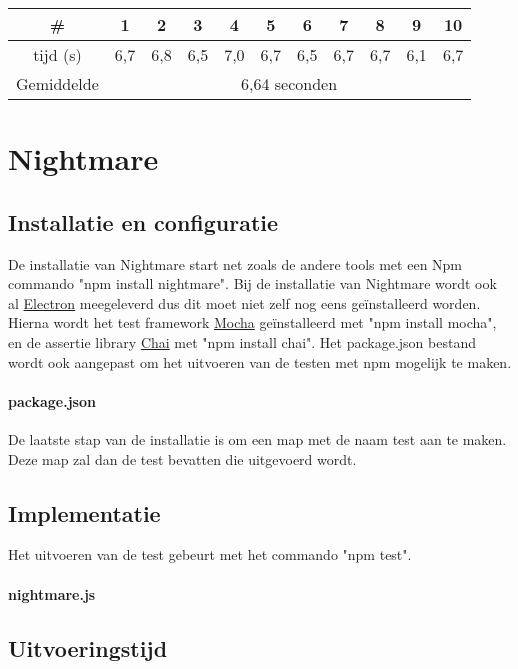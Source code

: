 \begin{tabular}{ |c| |c |c |c |c |c |c |c |c |c |c| }
\hline
	\# & 1 & 2 & 3 & 4 & 5 & 6 & 7 & 8 & 9 & 10\\
\hline
	tijd (s) & 6,7 & 6,8 & 6,5 & 7,0 & 6,7 & 6,5 & 6,7 & 6,7 & 6,1 & 6,7\\
\hline
 Gemiddelde & \multicolumn{10}{c|}{6,64 seconden}\\
\hline
\end{tabular}


\clearpage
\section{Nightmare}
\subsection{Installatie en configuratie}
De installatie van Nightmare start net zoals de andere \glspl{tool} met een Npm commando "npm install nightmare". Bij de installatie van Nightmare wordt ook al \hyperref[electron]{Electron} meegeleverd dus dit moet niet zelf nog eens geïnstalleerd worden. Hierna wordt het test \gls{framework} \hyperref[mocha]{Mocha} geïnstalleerd met "npm install mocha", en de \gls{assertie} \gls{library} \hyperref[chai]{Chai} met "npm install chai". Het package.json bestand wordt ook aangepast om het uitvoeren van de testen met npm mogelijk te maken.

\paragraph{package.json}

De laatste stap van de installatie is om een map met de naam test aan te maken. Deze map zal dan de test bevatten die uitgevoerd wordt.

\subsection{Implementatie}
Het uitvoeren van de test gebeurt met het commando "npm test".

\clearpage
\paragraph{nightmare.js}
\subsection{Uitvoeringstijd}

